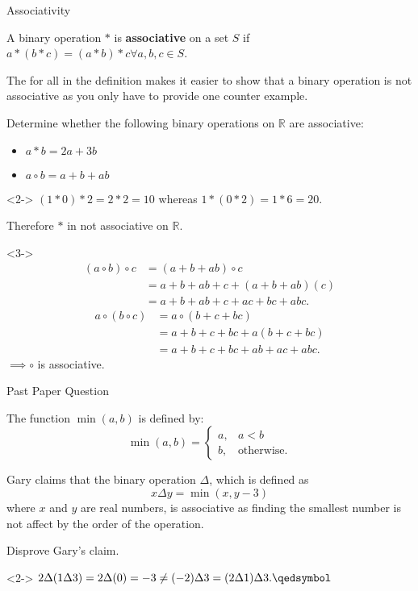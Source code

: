 \documentclass[8pt]{beamer}
\newcommand{\R}{\mathbb{R}}
\begin{document}
\begin{frame}{Associativity}
	\begin{definition}
		A binary operation $*$ is \textbf{associative} on  a set $S$ if  $a*(b*c)=(a*b)*c \forall a,b,c \in S$.
	\end{definition}

	\alert<1>{The for all in the definition makes it easier to show that a binary operation is not associative as you only have to provide one counter example.}

	\begin{problem}
		Determine whether the following binary operations on $\R$ are associative:
		\begin{itemize}
			\item $a*b=2a+3b$
			\item  $a \circ b = a + b + ab$
		\end{itemize}
	\end{problem}

	\begin{solution}<2->
		$(1*0)*2=2*2=10$ whereas  $1*(0*2)=1*6=20$.

		Therefore $*$ in not associative on  $ \R$.

	\end{solution}
	\begin{solution}<3->
		\begin{align*}
			(a \circ b)\circ c &= (a+b+ab)\circ c \\
					   &= a+b+ab+c+(a+b+ab)(c) \\
					   &= a +b+ab+c+ac+bc+abc 
		.\end{align*}
		\begin{align*}
			a \circ(b\circ c) &= a \circ (b+c+bc) \\
					  &= a+b+c+bc+a(b+c+bc) \\
					  &= a+b+c+bc+ab+ac+abc 
		.\end{align*}
$\implies \circ$ is associative.

	\end{solution}
\end{frame}

\begin{frame}{Past Paper Question}
	\begin{problem}
		The function $\min (a,b)$ is defined by:  \[
			\min(a,b)= \begin{cases}
				a, & a < b \\
				b, & \text{otherwise.}
			\end{cases}
		\]

		Gary claims that the binary operation $\Delta$, which is defined as  \[
			x \Delta y = \min(x,y-3)
		\] 
		where $x$ and  $y$ are real numbers, is associative as finding the smallest number is not affect by the order of the operation.

		Disprove Gary's claim.
	\end{problem}
	\begin{solution}<2->
		$2\Delta(1\Delta 3)=2\Delta (0) = -3 \neq (-2)\Delta 3=(2\Delta 1) \Delta 3. \qedsymbol$ 
	\end{solution}
\end{frame}
\end{document}
